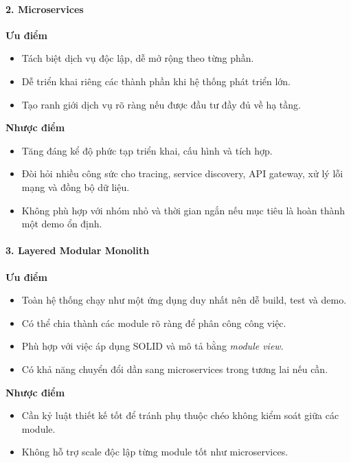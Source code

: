 \documentclass[12pt,a4paper]{article}
\begin{document}
\paragraph{2. Microservices}
\noindent\textbf{Ưu điểm}\par
\begin{itemize}
    \item Tách biệt dịch vụ độc lập, dễ mở rộng theo từng phần.
    \item Dễ triển khai riêng các thành phần khi hệ thống phát triển lớn.
    \item Tạo ranh giới dịch vụ rõ ràng nếu được đầu tư đầy đủ về hạ tầng.
\end{itemize}

\noindent\textbf{Nhược điểm}\par
\begin{itemize}
    \item Tăng đáng kể độ phức tạp triển khai, cấu hình và tích hợp.
    \item Đòi hỏi nhiều công sức cho tracing, service discovery, API gateway, xử lý lỗi mạng và đồng bộ dữ liệu.
    \item Không phù hợp với nhóm nhỏ và thời gian ngắn nếu mục tiêu là hoàn thành một demo ổn định.
\end{itemize}

\paragraph{3. Layered Modular Monolith}
\noindent\textbf{Ưu điểm}\par
\begin{itemize}
    \item Toàn hệ thống chạy như một ứng dụng duy nhất nên dễ build, test và demo.
    \item Có thể chia thành các module rõ ràng để phân công công việc.
    \item Phù hợp với việc áp dụng SOLID và mô tả bằng \textit{module view}.
    \item Có khả năng chuyển đổi dần sang microservices trong tương lai nếu cần.
\end{itemize}

\noindent\textbf{Nhược điểm}\par
\begin{itemize}
    \item Cần kỷ luật thiết kế tốt để tránh phụ thuộc chéo không kiểm soát giữa các module.
    \item Không hỗ trợ scale độc lập từng module tốt như microservices.
\end{itemize}
\end{document}

